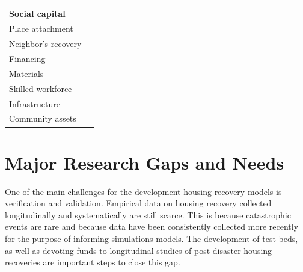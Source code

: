 \begin{table}[tbh]
\begin{tabularx}{\textwidth}{|l|X|}
    Social capital & \cite{airriess2008church,aldrich2010fixing,aldrich2011power,aldrich2012building,li2010katrina,burton2015validation,sadri2018role} \\ \midrule 
    
    Place attachment & \cite{chamlee2009there,cutter2010disaster,kick2011repetitive,binder2015rebuild,mcneil2015household,reid2015making} \\ \midrule
    
    Neighbor's recovery & \cite{dacy1969economics,rust2006financial,nejat2012agent} \\ \midrule 
    
    Financing & \cite{wu2004comparative,kamel2004residential,Nabil2004,Comerio2014,BankOfNZ2016,Nejat2016} \\ \midrule
    
    Materials & \cite{comerio2006estimating,REDi,bilau2015framework} \\ \midrule
    
    Skilled workforce & \cite{comerio2006estimating,chang2011identifying,boiser2011skills,bilau2015framework,hwang2015postdisaster,bothara2016challenges,REDi} \\ \midrule 
    
    Infrastructure & \cite{Miles2011,Comerio2014,burton2015validation,nejat2019anchors} \\ \midrule
    
    Community assets & \cite{Miles2011,Comerio2014,burton2015validation,nejat2019anchors} \\

    \bottomrule

    \end{tabularx}
    \label{tab:FactorsHousingRecovery}
\end{table}

\FloatBarrier
\section{Major Research Gaps and Needs}

One of the main challenges for the development housing recovery models is verification and validation. Empirical data on housing recovery collected longitudinally and systematically are still scarce. This is because catastrophic events are rare and because data have been consistently collected more recently  for the purpose of informing simulations models. The development of test beds, as well as devoting funds to longitudinal studies of post-disaster housing recoveries are important steps to close this gap.\ 

